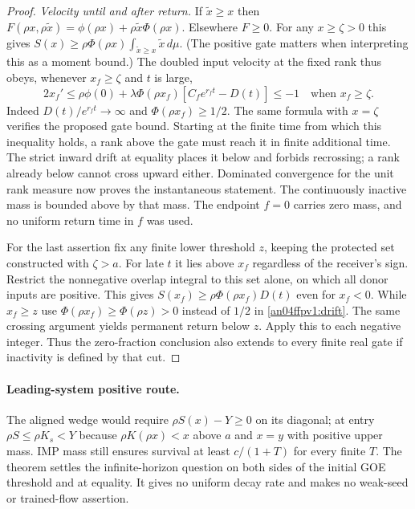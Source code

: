 \documentclass[11pt]{article}
\begin{document}
\begin{proof}
\emph{Velocity until and after return.} If $\tilde x\ge x$ then
$F(\rho x,\rho\tilde x)=\phi(\rho x)+\rho\tilde x\Phi(\rho x)$.
Elsewhere $F\ge0$. For any $x\ge\zeta>0$ this gives
$S(x)\ge\rho\Phi(\rho x)\int_{\tilde x\ge x}\tilde x\,d\mu$.
(The positive gate matters when interpreting this as a moment bound.)
The doubled input velocity at the fixed rank thus obeys, whenever
$x_f\ge\zeta$ and $t$ is large,
\begin{equation}\label{an04ffpv1:drift}
 2x_f'\le\rho\phi(0)+\lambda\Phi(\rho x_f)
          [C_f e^{r_ft}-D(t)]\le-1 \quad\text{when }x_f\ge\zeta .
\end{equation}
Indeed $D(t)/e^{r_ft}\to\infty$ and $\Phi(\rho x_f)\ge1/2$.
The same formula with $x=\zeta$ verifies the proposed gate bound.
Starting at the finite time from which this inequality holds,
a rank above the gate must reach it in finite additional time.
The strict inward drift at equality places it below and forbids
recrossing; a rank already below cannot cross upward either.
Dominated convergence for the unit rank measure now proves the
instantaneous statement. The continuously inactive mass is bounded
above by that mass. The endpoint $f=0$ carries zero mass, and no
uniform return time in $f$ was used.

For the last assertion fix any finite lower threshold $z$, keeping
the protected set constructed with $\zeta>a$. For late $t$ it lies
above $x_f$ regardless of the receiver's sign. Restrict the nonnegative
overlap integral to this set alone, on which all donor inputs are
positive. This gives $S(x_f)\ge\rho\Phi(\rho x_f)D(t)$ even for
$x_f<0$. While $x_f\ge z$ use $\Phi(\rho x_f)\ge\Phi(\rho z)>0$
instead of $1/2$ in \eqref{an04ffpv1:drift}. The same crossing
argument yields permanent return below $z$. Apply this to each negative
integer. Thus the zero-fraction conclusion also extends to every finite
real gate if inactivity is defined by that cut.
\end{proof}

\paragraph{Leading-system positive route.}
The aligned wedge would require $\rho S(x)-Y\ge0$ on its diagonal;
at entry $\rho S\le\rho K_s<Y$ because $\rho K(\rho x)<x$ above $a$
and $x=y$ with positive upper mass. IMP mass still ensures survival
at least $c/(1+T)$ for every finite $T$. The theorem settles the
infinite-horizon question on both sides of the initial GOE threshold
and at equality. It gives no uniform decay rate and makes no weak-seed
or trained-flow assertion.
\end{document}
